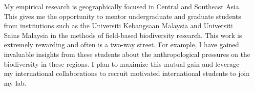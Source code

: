 My empirical research is geographically focused in Central and Southeast Asia.
This gives me the opportunity to mentor undergraduate and graduate students
from institutions such as the Universiti Kebangsaan Malaysia and Universiti Sains
Malaysia in the methods of field-based biodiversity research.
This work is extremely rewarding and often is a two-way street.
For example, I have gained invaluable insights from these students about the
anthropological pressures on the biodiversity in these regions.
I plan to maximize this mutual gain and leverage my international
collaborations to recruit motivated international students to join my lab.


